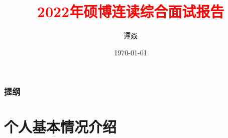 \documentclass[UTF8]{ctexbeamer}	%
\title{\textcolor{red}{2022年硕博连读综合面试报告}}
\author{谭焱 
 }
\institute{\small{硕士导师: 王何宇 \newline 申请导师: 张庆海} \newline   \newline 浙江大学数学科学学院}
\date{\today}
\theoremstyle{plain}
\theoremstyle{definition}
\newtheorem{emt}{}[section]
\theoremstyle{remark}
\numberwithin{equation}{section}
\begin{document}

\begin{frame}
\titlepage
\end{frame}


\begin{frame}
    \frametitle{提纲}
    \tableofcontents
  \end{frame}

\section{个人基本情况介绍}


        
\end{document}
